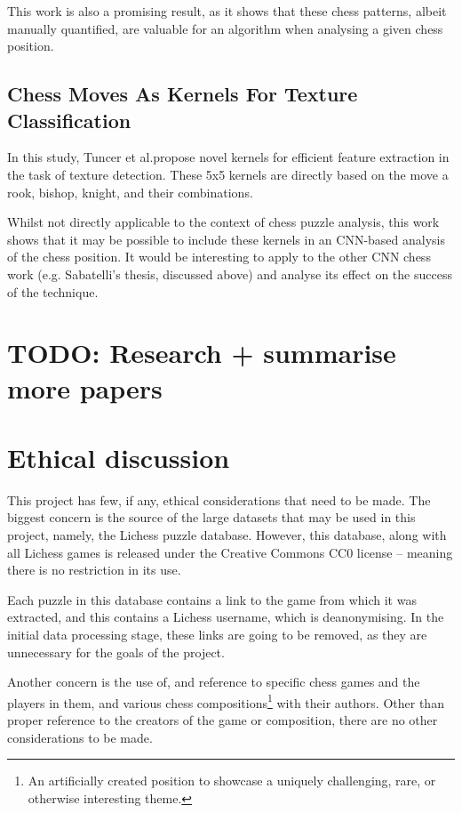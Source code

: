 This work is also a promising result, as it shows that these chess patterns,
albeit manually quantified, are valuable for an algorithm when analysing a
given chess position.

\subsection{Chess Moves As Kernels For Texture Classification}

In this study, Tuncer et al.\@ propose novel kernels for efficient feature
extraction in the task of texture detection.\cite{chessKernel} These 5x5
kernels are directly based on the move a rook, bishop, knight, and their
combinations. 

Whilst not directly applicable to the context of chess puzzle analysis, this
work shows that it may be possible to include these kernels in an CNN-based
analysis of the chess position. It would be interesting to apply to the other
CNN chess work (e.g. Sabatelli's thesis,\cite{chessCNN} discussed above) and
analyse its effect on the success of the technique.

\section{TODO: Research + summarise more papers}

\section{Ethical discussion}

This project has few, if any, ethical considerations that need to be made. The
biggest concern is the source of the large datasets that may be used in this
project, namely, the Lichess puzzle database.\cite{lichessPuzzles} However,
this database, along with all Lichess games is released under the Creative
Commons CC0 license -- meaning there is no restriction in its use.

Each puzzle in this database contains a link to the game from which it was
extracted, and this contains a Lichess username, which is deanonymising. In the
initial data processing stage, these links are going to be removed, as they are
unnecessary for the goals of the project.

Another concern is the use of, and reference to specific chess games and the
players in them, and various chess compositions\footnote{An artificially
created position to showcase a uniquely challenging, rare, or otherwise
interesting theme.} with their authors. Other than proper reference to the
creators of the game or composition, there are no other considerations to be
made.

